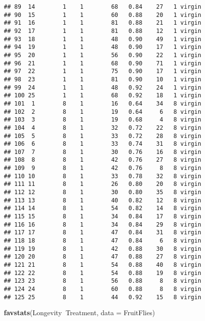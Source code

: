 \documentclass[]{article}
\newenvironment{Shaded}{\begin{snugshade}}{\end{snugshade}}
\newcommand{\DataTypeTok}[1]{\textcolor[rgb]{0.13,0.29,0.53}{#1}}
\newcommand{\KeywordTok}[1]{\textcolor[rgb]{0.13,0.29,0.53}{\textbf{#1}}}
\newcommand{\NormalTok}[1]{#1}
\newcommand{\OperatorTok}[1]{\textcolor[rgb]{0.81,0.36,0.00}{\textbf{#1}}}
\begin{document}
\begin{verbatim}
## 89  14        1    1        68   0.84    27   1 virgin
## 90  15        1    1        60   0.88    20   1 virgin
## 91  16        1    1        81   0.88    21   1 virgin
## 92  17        1    1        81   0.88    12   1 virgin
## 93  18        1    1        48   0.90    49   1 virgin
## 94  19        1    1        48   0.90    17   1 virgin
## 95  20        1    1        56   0.90    22   1 virgin
## 96  21        1    1        68   0.90    71   1 virgin
## 97  22        1    1        75   0.90    17   1 virgin
## 98  23        1    1        81   0.90    10   1 virgin
## 99  24        1    1        48   0.92    24   1 virgin
## 100 25        1    1        68   0.92    18   1 virgin
## 101  1        8    1        16   0.64    34   8 virgin
## 102  2        8    1        19   0.64     6   8 virgin
## 103  3        8    1        19   0.68     4   8 virgin
## 104  4        8    1        32   0.72    22   8 virgin
## 105  5        8    1        33   0.72    28   8 virgin
## 106  6        8    1        33   0.74    31   8 virgin
## 107  7        8    1        30   0.76    16   8 virgin
## 108  8        8    1        42   0.76    27   8 virgin
## 109  9        8    1        42   0.76     8   8 virgin
## 110 10        8    1        33   0.78    32   8 virgin
## 111 11        8    1        26   0.80    20   8 virgin
## 112 12        8    1        30   0.80    35   8 virgin
## 113 13        8    1        40   0.82    12   8 virgin
## 114 14        8    1        54   0.82    14   8 virgin
## 115 15        8    1        34   0.84    17   8 virgin
## 116 16        8    1        34   0.84    29   8 virgin
## 117 17        8    1        47   0.84    31   8 virgin
## 118 18        8    1        47   0.84     6   8 virgin
## 119 19        8    1        42   0.88    30   8 virgin
## 120 20        8    1        47   0.88    27   8 virgin
## 121 21        8    1        54   0.88    40   8 virgin
## 122 22        8    1        54   0.88    19   8 virgin
## 123 23        8    1        56   0.88     8   8 virgin
## 124 24        8    1        60   0.88     8   8 virgin
## 125 25        8    1        44   0.92    15   8 virgin
\end{verbatim}

\begin{Shaded}
\begin{Highlighting}[]
\KeywordTok{favstats}\NormalTok{(Longevity}\OperatorTok{~}\NormalTok{Treatment, }\DataTypeTok{data =}\NormalTok{ FruitFlies)}
\end{Highlighting}
\end{Shaded}
\end{document}
